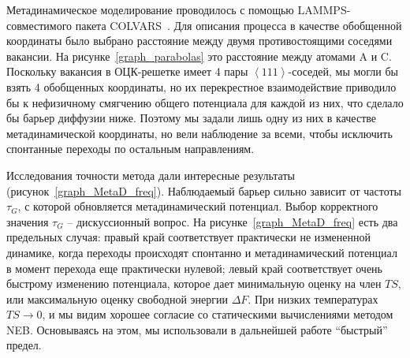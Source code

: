 \documentclass[master,14pt,subf,href,colorlinks=true
]{disser}
\begin{document}
Метадинамическое моделирование проводилось с помощью LAMMPS-совместимого пакета COLVARS~\cite{COLVARS}. Для описания процесса в качестве обобщенной координаты было выбрано расстояние между двумя противостоящими соседями вакансии. На рисунке~\ref{graph_parabolas} это расстояние между атомами A и C.
Поскольку вакансия в ОЦК-решетке имеет 4 пары $\left\langle 111\right\rangle$-соседей, мы могли бы взять 4 обобщенных координаты, но их перекрестное взаимодействие приводило бы к нефизичному смягчению общего потенциала для каждой из них, что сделало бы барьер диффузии ниже. Поэтому мы задали лишь одну из них в качестве метадинамической координаты, но вели наблюдение за всеми, чтобы исключить спонтанные переходы по остальным направлениям.

Исследования точности метода дали интересные результаты (рисунок~\ref{graph_MetaD_freq}). Наблюдаемый барьер сильно зависит от частоты $\tau_G$, с которой обновляется метадинамический потенциал. Выбор корректного значения  $\tau_G$ -- дискуссионный вопрос.
На рисунке~\ref{graph_MetaD_freq} есть два предельных случая: правый край соответствует практически не измененной динамике, когда переходы происходят спонтанно и метадинамический потенциал в момент перехода еще практически нулевой; левый край соответствует очень быстрому изменению потенциала, которое дает минимальную оценку на член $TS$, или максимальную оценку свободной энергии $\Delta F$. При низких температурах $TS \to 0$, и мы видим хорошее согласие со статическими вычислениями методом NEB. Основываясь на этом, мы использовали в дальнейшей работе ``быстрый'' предел.
\end{document}

